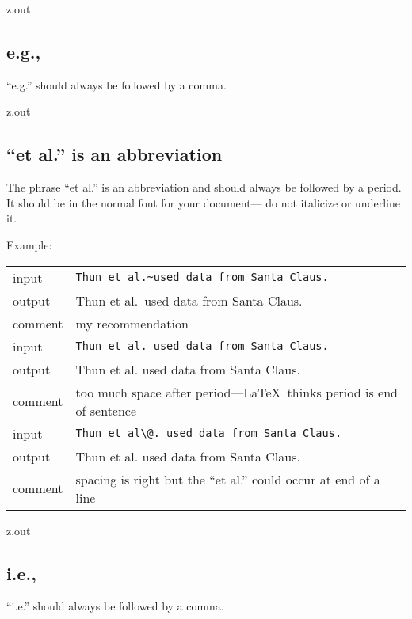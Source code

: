 \MyIO


\begin{VerbatimOut}{z.out}

\subsection{e.g.,}

``e.g.'' should always be followed by a comma.
\end{VerbatimOut}

\MyIO


\begin{VerbatimOut}{z.out}

\subsection{``et al.'' is an abbreviation}

The phrase ``et al.''
is an abbreviation
and should always be followed by a period.
It should be in the normal font for your document---%
do not italicize or underline it.

Example:\\[6pt]
\indent\indent
\begin{tabular}{@{}ll@{}}
  input&   \verb+Thun et al.~used data from Santa Claus.+\\
  output&  Thun et al.~used data from Santa Claus.\\
  comment& my recommendation\\[6pt]
  input&   \verb+Thun et al. used data from Santa Claus.+\\
  output&  Thun et al. used data from Santa Claus.\\
  comment& too much space after period---\LaTeX\ thinks period is end of sentence\\[6pt]
  input&   \verb+Thun et al\@. used data from Santa Claus.+\\
  output&  Thun et al\@. used data from Santa Claus.\\
  comment& spacing is right but the ``et al.'' could occur at end of a line\\
\end{tabular}
\end{VerbatimOut}

\MyIO


\begin{VerbatimOut}{z.out}

\subsection{i.e.,}

``i.e.'' should always be followed by a comma.
\end{VerbatimOut}

\MyIO

